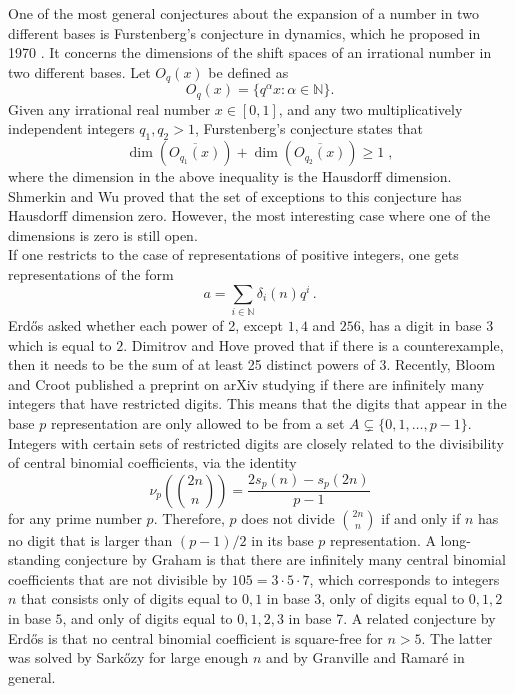 \documentclass[12pt]{amsart}
\renewcommand{\geq}{\geqslant}
\theoremstyle{definition}
\numberwithin{equation}{section}
\newcommand\NN{\mathbb{N}}
\numberwithin{equation}{section}
\begin{document}
One of the most general conjectures about the expansion of a number in two different bases is Furstenberg's conjecture in dynamics, which he proposed in 1970 \cite{Furstenberg1970}. It concerns the dimensions of the shift spaces of an irrational number in two different bases. Let $O_q(x)$ be defined as 
\[ 
    O_q(x)=\{q^{\alpha}x:\alpha\in \NN\}.
\]
Given any irrational real number $x\in [0,1]$, and any two multiplicatively independent integers $q_1,q_2>1$, Furstenberg's conjecture states that
\[\dim(\overline{O_{q_1}(x)})+\dim(\overline{O_{q_2}(x)})\geq1\;,\]
where the dimension in the above inequality is the Hausdorff dimension. Shmerkin \cite{Shmerkin2019} and Wu \cite{Wu2019} proved that the set of exceptions to this conjecture has Hausdorff dimension zero. However, the most interesting case where one of the dimensions is zero is still open.\\

If one restricts to the case of representations of positive integers, one gets representations of the form
\begin{equation}
	a= \sum_{i\in \NN} \delta_i(n)q^i\,.
\end{equation}
Erd\H{o}s \cite{Erdos1979} asked whether each power of 2, except $1,4$ and $256$, has a digit in base $3$ which is equal to $2$. Dimitrov and Hove \cite{DimitrovHowe2021} proved that if there is a counterexample, then it needs to be the sum of at least 25 distinct powers of $3$. Recently, Bloom and Croot \cite{BloomCroot2025} published a preprint on arXiv studying if there are infinitely many integers that have restricted digits. This means that the digits that appear in the base $p$ representation are only allowed to be from a set $A\subsetneq \{0,1,\dots,\mathrel{{p}{-}{1}}\}$. Integers with certain sets of restricted digits are closely related to the divisibility of central binomial coefficients, via the identity
\[
	\nu_p \left(\binom{2n}{n}\right) = \frac{2s_p(n)-s_p(2n)}{p-1}
\]
for any prime number $p$. Therefore, $p$ does not divide $\binom{2n}{n}$ if and only if $n$ has no digit that is larger than $(p-1)/2$ in its base $p$ representation. A long-standing conjecture by Graham \cite{Erdos1980} is that there are infinitely many central binomial coefficients that are not divisible by $105=3\cdot5\cdot7$, which corresponds to integers $n$ that consists only of digits equal to $0,1$ in base $3$, only of digits equal to $0,1,2$ in base $5$, and only of digits equal to $0,1,2,3$ in base 7. A related conjecture by Erd\H{o}s \cite[p.71]{Erdos1980} is that no central binomial coefficient is square-free for $n>5$. The latter was solved by Sark\H{o}zy \cite{Sarkozy1985} for large enough $n$ and by Granville and Ramaré \cite{GranvilleRamare1996} in general.
\end{document}
